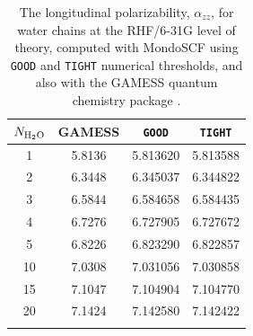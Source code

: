 \documentclass[prl,twocolumn,showpacs,twocolumngrid,superbib]{revtex4}
\newcommand{\commentoutA}[1]{#1}
\begin{document}
\commentoutA{

\begin{table}[h]
  \centering
  \caption{\protect
    The longitudinal polarizability, $\alpha_{zz}$, for water chains at the RHF/6-31G level
    of theory, computed with {\sc MondoSCF} using {\tt GOOD} and {\tt TIGHT} numerical thresholds, 
   and also with the {\sc GAMESS} quantum chemistry package \cite{gamess}.
  }\label{tab:Alpha_1D_Values}
  \begin{tabular}{cccc}
    \toprule
    $N_{\rm H_2 O}$ &\multicolumn{1}{c}{{\sc GAMESS}}
        &\multicolumn{1}{c}{{\tt GOOD}}
        &\multicolumn{1}{c}{{\tt TIGHT}}\\
    \hline
    1 & 5.8136 & 5.813620 & 5.813588 \\
    2 & 6.3448 & 6.345037 & 6.344822 \\
    3 & 6.5844 & 6.584658 & 6.584435 \\
    4 & 6.7276 & 6.727905 & 6.727672 \\
    5 & 6.8226 & 6.823290 & 6.822857 \\
   10 & 7.0308 & 7.031056 & 7.030858 \\
   15 & 7.1047 & 7.104904 & 7.104770 \\
   20 & 7.1424 & 7.142580 & 7.142422 \\
    \botrule
  \end{tabular}
\end{table}

}
\end{document}
